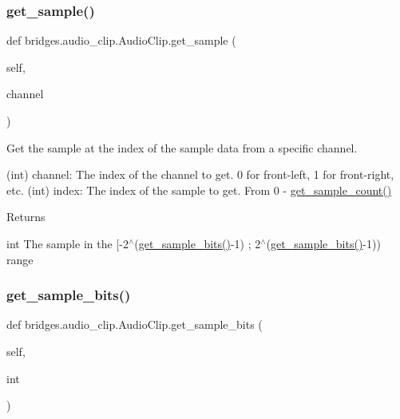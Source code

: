 \subsubsection{\texorpdfstring{get\+\_\+sample()}{get\_sample()}}
{\footnotesize\ttfamily def bridges.\+audio\+\_\+clip.\+Audio\+Clip.\+get\+\_\+sample (\begin{DoxyParamCaption}\item[{}]{self,  }\item[{}]{channel }\end{DoxyParamCaption})}



Get the sample at the index of the sample data from a specific channel. 

(int) channel\+: The index of the channel to get. 0 for front-\/left, 1 for front-\/right, etc. (int) index\+: The index of the sample to get. From 0 -\/ \hyperlink{classbridges_1_1audio__clip_1_1_audio_clip_ace0227160e6743e8fd19c803af81d474}{get\+\_\+sample\+\_\+count()} \begin{DoxyReturn}{Returns}


int The sample in the \mbox{[}-\/2$^\wedge$(\hyperlink{classbridges_1_1audio__clip_1_1_audio_clip_a8dc41d20f5c06e83f7aea326072ef32e}{get\+\_\+sample\+\_\+bits()}-\/1) ; 2$^\wedge$(\hyperlink{classbridges_1_1audio__clip_1_1_audio_clip_a8dc41d20f5c06e83f7aea326072ef32e}{get\+\_\+sample\+\_\+bits()}-\/1)) range 
\end{DoxyReturn}
\mbox{\label{classbridges_1_1audio__clip_1_1_audio_clip_a8dc41d20f5c06e83f7aea326072ef32e}} 
\subsubsection{\texorpdfstring{get\+\_\+sample\+\_\+bits()}{get\_sample\_bits()}}
{\footnotesize\ttfamily def bridges.\+audio\+\_\+clip.\+Audio\+Clip.\+get\+\_\+sample\+\_\+bits (\begin{DoxyParamCaption}\item[{}]{self,  }\item[{}]{int }\end{DoxyParamCaption})}



